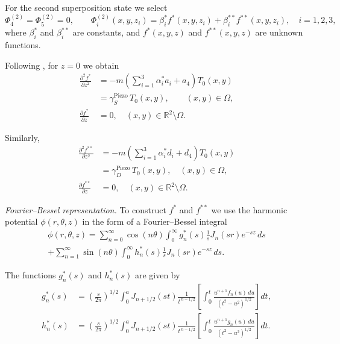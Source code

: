 For the second superposition state we select
\[
\Phi_4^{(2)}=\Phi_5^{(2)}=0,
\qquad
\Phi_i^{(2)}(x,y,z_i)
=
\beta_i^{*}f^{*}(x,y,z_i)
+
\beta_i^{**}f^{**}(x,y,z_i),
\quad i=1,2,3,
\]
where $\beta_i^{*}$ and $\beta_i^{**}$ are constants, and
$f^{*}(x,y,z)$ and $f^{**}(x,y,z)$ are unknown functions.

Following \cite{Kirilyuk4}, for $z=0$ we obtain
\begin{equation}
	\begin{aligned}
	\frac{\partial^2 f^{*}}{\partial z^2}
	&=
	-m\left(\sum_{i=1}^{3}\alpha_i^{*}a_i+a_4\right)T_0(x,y)
	\\
	&=
	\gamma_S^{\text{Piezo}}\,T_0(x,y),
	\qquad (x,y)\in\Omega,
	\\
\frac{\partial f^{*}}{\partial z}&=0,
\quad (x,y)\in\mathbb{R}^2\setminus\Omega .
\end{aligned}
\label{KirilyukEq16}
\end{equation}

Similarly,
\begin{equation}
	\begin{aligned}
	\frac{\partial^2 f^{**}}{\partial z^2}
	&=
	-m\left(\sum_{i=1}^{3}\alpha_i^{*}d_i+d_4\right)T_0(x,y)
	\\
	&=
	\gamma_D^{\text{Piezo}}\,T_0(x,y),
	\quad (x,y)\in\Omega,
\\
\frac{\partial f^{**}}{\partial z}&=0,
\quad (x,y)\in\mathbb{R}^2\setminus\Omega .
\end{aligned}
\label{KirilyukEq17}
\end{equation}

\medskip
\emph{Fourier–Bessel representation.} To construct $f^{*}$ and $f^{**}$ we use the harmonic potential
$\phi(r,\theta,z)$ in the form of a Fourier--Bessel integral \cite{Kirilyuk7}
\begin{multline}
	\phi(r,\theta,z)
	=
	\sum_{n=0}^{\infty}
	\cos(n\theta)
	\int_{0}^{\infty}
	g_n^{*}(s)
	\frac{1}{s}
	J_n(sr)e^{-sz}\,ds
	\\
	+
	\sum_{n=1}^{\infty}
	\sin(n\theta)
	\int_{0}^{\infty}
	h_n^{*}(s)
	\frac{1}{s}
	J_n(sr)e^{-sz}\,ds .
	\label{KirilyukEq18}
\end{multline}

The functions $g_n^{*}(s)$ and $h_n^{*}(s)$ are given by
\begin{align*}
g_n^{*}(s)
&=
\left(\frac{s}{2\pi}\right)^{1/2}
\int_{0}^{a}
J_{n+1/2}(st)
\frac{1}{t^{\,n-1/2}}
\left[
\int_{0}^{t}
\frac{u^{n+1}f_n(u)\,du}{(t^2-u^2)^{1/2}}
\right]dt,
\\
h_n^{*}(s)
&=
\left(\frac{s}{2\pi}\right)^{1/2}
\int_{0}^{a}
J_{n+1/2}(st)
\frac{1}{t^{\,n-1/2}}
\left[
\int_{0}^{t}
\frac{u^{n+1}g_n(u)\,du}{(t^2-u^2)^{1/2}}
\right]dt .
\end{align*}

